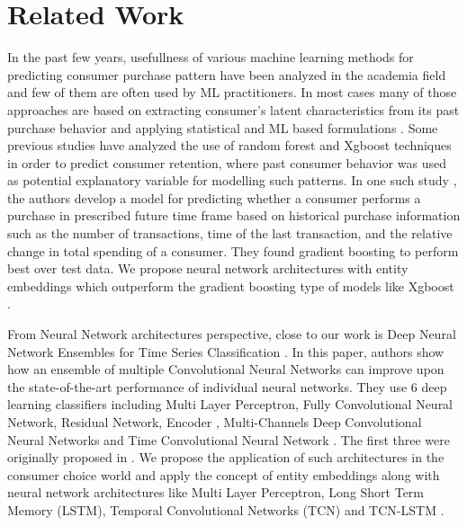 \section{Related Work}
\label{sec:relatedwork}
In the past few years, usefullness of various machine learning methods for predicting consumer purchase pattern have been 
analyzed in the academia field and few of them are often used by ML practitioners. In most cases many of those approaches are 
based on extracting consumer's latent characteristics from its past purchase behavior and applying statistical and  
ML based formulations \cite{fader2009probability, choudhury2019machine}. 
Some previous studies have analyzed the use of random forest and Xgboost techniques in order to predict 
consumer retention, where past consumer behavior was used as potential explanatory variable 
for modelling such patterns. In one such study \cite{martinez2020machine}, the authors develop a model for predicting whether a 
consumer performs a purchase in prescribed future time frame based on historical purchase information such as the number
of transactions, time of the last transaction, and the relative change in total spending of a consumer. 
They found gradient boosting to perform best over test data. We propose neural network architectures with entity embeddings
\cite{guo2016entity} which outperform the gradient boosting type of models like Xgboost \cite{chen2016xgboost}. 

From Neural Network architectures perspective,
close to our work is Deep Neural Network Ensembles for Time Series Classification \cite{fawaz2019deep}. 
In this paper, authors show how an ensemble of multiple Convolutional Neural Networks can improve upon the 
state-of-the-art performance of individual neural networks. They use 6 deep learning classifiers 
including Multi Layer Perceptron, Fully Convolutional Neural Network, Residual Network, 
Encoder \cite{serra2018towards}, Multi-Channels Deep Convolutional Neural Networks \cite{zheng2014time} and 
Time Convolutional Neural Network \cite{zhao2017convolutional}. The first three were originally proposed in \cite{wang2017time}.
We propose the application of such architectures in the consumer choice world and apply the concept of entity embeddings 
\cite{guo2016entity} along with neural network architectures
like Multi Layer Perceptron, Long Short Term Memory (LSTM), Temporal Convolutional Networks (TCN) \cite{lea2016temporal} and 
TCN-LSTM \cite{karim2017lstm}.

